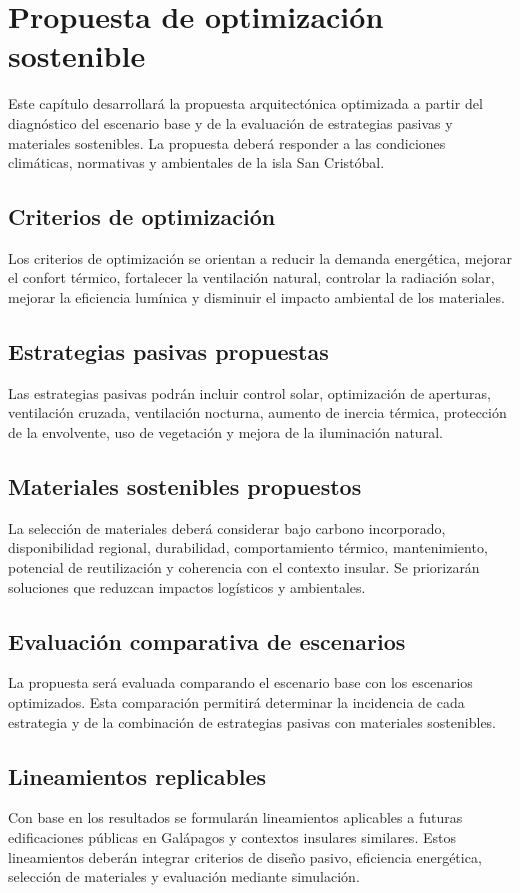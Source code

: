 \chapter{Propuesta de optimización sostenible}

Este capítulo desarrollará la propuesta arquitectónica optimizada a partir del diagnóstico del escenario base y de la evaluación de estrategias pasivas y materiales sostenibles. La propuesta deberá responder a las condiciones climáticas, normativas y ambientales de la isla San Cristóbal.

\section{Criterios de optimización}

Los criterios de optimización se orientan a reducir la demanda energética, mejorar el confort térmico, fortalecer la ventilación natural, controlar la radiación solar, mejorar la eficiencia lumínica y disminuir el impacto ambiental de los materiales.

\section{Estrategias pasivas propuestas}

Las estrategias pasivas podrán incluir control solar, optimización de aperturas, ventilación cruzada, ventilación nocturna, aumento de inercia térmica, protección de la envolvente, uso de vegetación y mejora de la iluminación natural.

\section{Materiales sostenibles propuestos}

La selección de materiales deberá considerar bajo carbono incorporado, disponibilidad regional, durabilidad, comportamiento térmico, mantenimiento, potencial de reutilización y coherencia con el contexto insular. Se priorizarán soluciones que reduzcan impactos logísticos y ambientales.

\section{Evaluación comparativa de escenarios}

La propuesta será evaluada comparando el escenario base con los escenarios optimizados. Esta comparación permitirá determinar la incidencia de cada estrategia y de la combinación de estrategias pasivas con materiales sostenibles.

\section{Lineamientos replicables}

Con base en los resultados se formularán lineamientos aplicables a futuras edificaciones públicas en Galápagos y contextos insulares similares. Estos lineamientos deberán integrar criterios de diseño pasivo, eficiencia energética, selección de materiales y evaluación mediante simulación.
